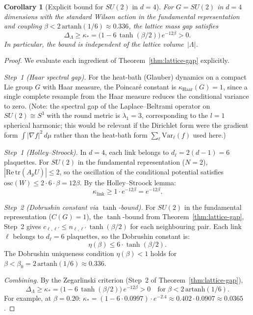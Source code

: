 \documentclass[12pt,a4paper]{article}
\theoremstyle{definition}
\theoremstyle{plain}
\newtheorem{corollary}[definition]{Corollary}
\theoremstyle{remark}
\begin{document}
\begin{corollary}[Explicit bound for $SU(2)$ in $d=4$]
\label{cor:su2-explicit}
For $G = SU(2)$ in $d = 4$ dimensions with the standard Wilson action in the fundamental representation and coupling $\beta < 2\,\mathrm{artanh}(1/6) \approx 0.336$, the lattice mass gap satisfies
\begin{equation}\label{eq:su2-gap}
    \Delta_\Lambda \geq \kappa_* = \bigl(1 - 6\,\tanh(\beta/2)\bigr)\,e^{-12\beta} > 0.
\end{equation}
In particular, the bound is independent of the lattice volume~$|\Lambda|$.
\end{corollary}

\begin{proof}
We evaluate each ingredient of Theorem~\ref{thm:lattice-gap} explicitly.

\emph{Step~1 (Haar spectral gap).} For the heat-bath (Glauber) dynamics on a compact Lie group $G$ with Haar measure, the Poincar\'e constant is $\kappa_{\mathrm{Haar}}(G) = 1$, since a single complete resample from the Haar measure reduces the conditional variance to zero.  (Note: the spectral gap of the Laplace--Beltrami operator on $SU(2) \cong S^3$ with the round metric is $\lambda_1 = 3$, corresponding to the $l=1$ spherical harmonic; this would be relevant if the Dirichlet form were the gradient form $\int |\nabla f|^2\,d\mu$ rather than the heat-bath form $\sum_\ell \mathrm{Var}_\ell(f)$ used here.)

\emph{Step~1 (Holley--Stroock).} In $d=4$, each link belongs to $d_\ell = 2(d-1) = 6$ plaquettes. For $SU(2)$ in the fundamental representation ($N=2$), $|\mathrm{Re}\,\mathrm{tr}(A_p U)| \leq 2$, so the oscillation of the conditional potential satisfies $\mathrm{osc}(W) \leq 2 \cdot 6 \cdot \beta = 12\beta$. By the Holley--Stroock lemma:
\[
    \kappa_{\mathrm{link}} \geq 1 \cdot e^{-12\beta} = e^{-12\beta}.
\]

\emph{Step~2 (Dobrushin constant via $\tanh$-bound).} For $SU(2)$ in the fundamental representation ($C(G) = 1$), the $\tanh$-bound from Theorem~\ref{thm:lattice-gap}, Step~2 gives $c_{\ell,\ell'} \leq n_{\ell,\ell'}\,\tanh(\beta/2)$ for each neighbouring pair. Each link~$\ell$ belongs to $d_\ell = 6$ plaquettes, so the Dobrushin constant is:
\[
    \eta(\beta) \leq 6 \cdot \tanh(\beta/2).
\]
The Dobrushin uniqueness condition $\eta(\beta) < 1$ holds for $\beta < \beta_0 = 2\,\mathrm{artanh}(1/6) \approx 0.336$.

\emph{Combining.} By the Zegarlinski criterion (Step~2 of Theorem~\ref{thm:lattice-gap}),
\[
    \Delta_\Lambda \geq \kappa_* = \bigl(1 - 6\,\tanh(\beta/2)\bigr)\,e^{-12\beta} > 0 \quad\text{for}\;\beta < 2\,\mathrm{artanh}(1/6).
\]
For example, at $\beta = 0.20$: $\kappa_* = (1 - 6 \cdot 0.0997)\cdot e^{-2.4} \approx 0.402 \cdot 0.0907 \approx 0.0365$.
\end{proof}
\end{document}
